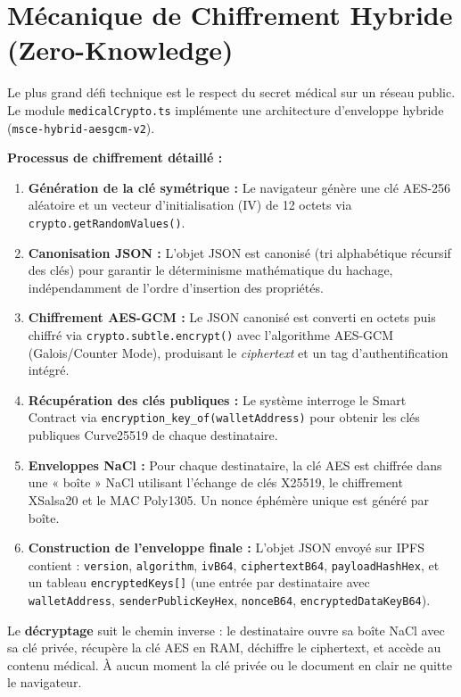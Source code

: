 \documentclass[12pt,a4paper]{report}
\begin{document}
\section{Mécanique de Chiffrement Hybride (Zero-Knowledge)}
Le plus grand défi technique est le respect du secret médical sur un réseau public. Le module \texttt{medicalCrypto.ts} implémente une architecture d'enveloppe hybride (\texttt{msce-hybrid-aesgcm-v2}).

\textbf{Processus de chiffrement détaillé :}
\begin{enumerate}
    \item \textbf{Génération de la clé symétrique :} Le navigateur génère une clé AES-256 aléatoire et un vecteur d'initialisation (IV) de 12 octets via \texttt{crypto.getRandomValues()}.
    \item \textbf{Canonisation JSON :} L'objet JSON est canonisé (tri alphabétique récursif des clés) pour garantir le déterminisme mathématique du hachage, indépendamment de l'ordre d'insertion des propriétés.
    \item \textbf{Chiffrement AES-GCM :} Le JSON canonisé est converti en octets puis chiffré via \texttt{crypto.subtle.encrypt()} avec l'algorithme AES-GCM (Galois/Counter Mode), produisant le \textit{ciphertext} et un tag d'authentification intégré.
    \item \textbf{Récupération des clés publiques :} Le système interroge le Smart Contract via \texttt{encryption\_key\_of(walletAddress)} pour obtenir les clés publiques Curve25519 de chaque destinataire.
    \item \textbf{Enveloppes NaCl :} Pour chaque destinataire, la clé AES est chiffrée dans une « boîte » NaCl utilisant l'échange de clés X25519, le chiffrement XSalsa20 et le MAC Poly1305. Un nonce éphémère unique est généré par boîte.
    \item \textbf{Construction de l'enveloppe finale :} L'objet JSON envoyé sur IPFS contient : \texttt{version}, \texttt{algorithm}, \texttt{ivB64}, \texttt{ciphertextB64}, \texttt{payloadHashHex}, et un tableau \texttt{encryptedKeys[]} (une entrée par destinataire avec \texttt{walletAddress}, \texttt{senderPublicKeyHex}, \texttt{nonceB64}, \texttt{encryptedDataKeyB64}).
\end{enumerate}

Le \textbf{décryptage} suit le chemin inverse : le destinataire ouvre sa boîte NaCl avec sa clé privée, récupère la clé AES en RAM, déchiffre le ciphertext, et accède au contenu médical. À aucun moment la clé privée ou le document en clair ne quitte le navigateur.
\end{document}
